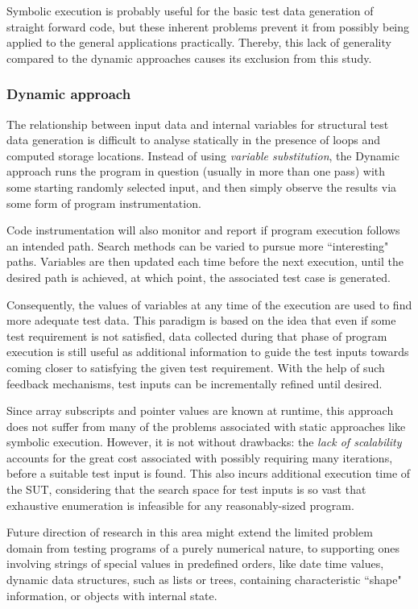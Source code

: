 \documentclass{icldt}
\numberwithin{equation}{section}       %
\begin{document}
Symbolic execution is probably useful for the basic test data generation of straight forward code, but these inherent problems prevent it from possibly being applied to the general applications practically. Thereby, this lack of generality compared to the dynamic approaches causes its exclusion from this study.

	\subsubsection{Dynamic approach}
The relationship between input data and internal variables for structural test data generation is difficult to analyse statically in the presence of loops and computed storage locations. Instead of using \emph{variable substitution}, the Dynamic approach runs the program in question (usually in more than one pass) with some starting randomly selected input, and then simply observe the results via some form of program instrumentation.

Code instrumentation will also monitor and report if program execution follows an intended path. Search methods can be varied to pursue more ``interesting" paths. Variables are then updated each time before the next execution, until the desired path is achieved, at which point, the associated test case is generated.

Consequently, the values of variables at any time of the execution are used to find more adequate test data. This paradigm is based on the idea that even if some test requirement is not satisfied, data collected during that phase of program execution is still useful as additional information to guide the test inputs towards coming closer to satisfying the given test requirement. With the help of such feedback mechanisms, test inputs can be incrementally refined until desired.

Since array subscripts and pointer values are known at runtime, this approach does not suffer from many of the problems associated with static approaches like symbolic execution. However, it is not without drawbacks: the \emph{lack of scalability} accounts for the great cost associated with possibly requiring many iterations, before a suitable test input is found. This also incurs additional execution time of the SUT, considering that the search space for test inputs is so vast that exhaustive enumeration is infeasible for any reasonably-sized program.

Future direction of research in this area might extend the limited problem domain from testing programs of a purely numerical nature, to supporting ones involving strings of special values in predefined orders, like date time values, dynamic data structures, such as lists or trees, containing characteristic ``shape" information, or objects with internal state.
\end{document}
